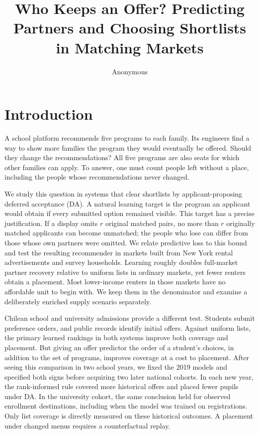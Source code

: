 \documentclass[format=acmsmall,review=false]{acmart}
\title[Who Keeps an Offer?]{Who Keeps an Offer? Predicting Partners and Choosing Shortlists in Matching Markets}
\author{Anonymous}
\begin{document}
\begin{titlepage}
\maketitle
\thispagestyle{empty}
\end{titlepage}

\section{Introduction}
A school platform recommends five programs to each family. Its engineers find a way to show more families the program they would eventually be offered. Should they change the recommendations? All five programs are also seats for which other families can apply. To answer, one must count people left without a place, including the people whose recommendations never changed.

We study this question in systems that clear shortlists by applicant-proposing deferred acceptance (DA). A natural learning target is the program an applicant would obtain if every submitted option remained visible. This target has a precise justification. If a display omits $r$ original matched pairs, no more than $r$ originally matched applicants can become unmatched; the people who lose can differ from those whose own partners were omitted. We relate predictive loss to this bound and test the resulting recommender in markets built from New York rental advertisements and survey households. Learning roughly doubles full-market partner recovery relative to uniform lists in ordinary markets, yet fewer renters obtain a placement. Most lower-income renters in those markets have no affordable unit to begin with. We keep them in the denominator and examine a deliberately enriched supply scenario separately.

Chilean school and university admissions provide a different test. Students submit preference orders, and public records identify initial offers. Against uniform lists, the primary learned rankings in both systems improve both coverage and placement. But giving an offer predictor the order of a student's choices, in addition to the set of programs, improves coverage at a cost to placement. After seeing this comparison in two school years, we fixed the 2019 models and specified both signs before acquiring two later national cohorts. In each new year, the rank-informed rule covered more historical offers and placed fewer pupils under DA. In the university cohort, the same conclusion held for observed enrollment destinations, including when the model was trained on registrations. Only list coverage is directly measured on these historical outcomes. A placement under changed menus requires a counterfactual replay.
\end{document}
